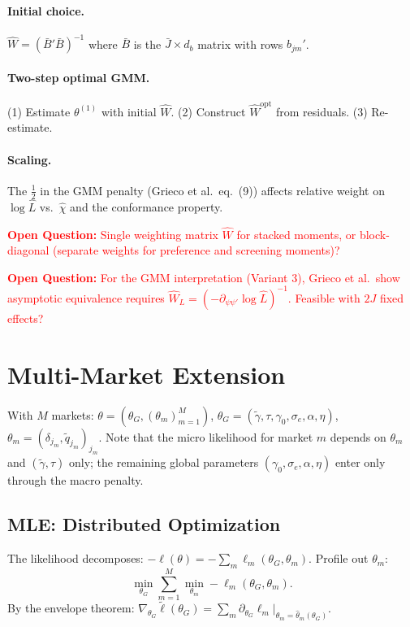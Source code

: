 \documentclass[11pt]{article}
\newcommand{\openq}[1]{\medskip\noindent\textcolor{red}{\textbf{Open Question:} #1}\medskip}
\begin{document}
\paragraph{Initial choice.} $\hat W = (\bar B'\bar B)^{-1}$ where $\bar B$ is the $\bar J\times d_b$ matrix with rows $b_{jm}'$.

\paragraph{Two-step optimal GMM.} (1) Estimate $\theta^{(1)}$ with initial $\hat W$. (2) Construct $\hat W^{\text{opt}}$ from residuals. (3) Re-estimate.

\paragraph{Scaling.} The $\frac{1}{2}$ in the GMM penalty (Grieco et al.\ eq.\ (9)) affects relative weight on $\log\hat L$ vs.\ $\hat\chi$ and the conformance property.

\openq{Single weighting matrix $\hat W$ for stacked moments, or block-diagonal (separate weights for preference and screening moments)?}

\openq{For the GMM interpretation (Variant 3), Grieco et al.\ show asymptotic equivalence requires $\hat W_L = (-\partial_{\psi\psi'}\log\hat L)^{-1}$. Feasible with $2J$ fixed effects?}


\section{Multi-Market Extension}\label{sec:multimarket}

With $M$ markets: $\theta = (\theta_G, (\theta_m)_{m=1}^M)$, $\theta_G=(\tilde\gamma,\tau,\gamma_0,\sigma_e,\alpha,\eta)$, $\theta_m = (\delta_{j_m},\tilde q_{j_m})_{j_m}$. Note that the micro likelihood for market $m$ depends on $\theta_m$ and $(\tilde\gamma,\tau)$ only; the remaining global parameters $(\gamma_0,\sigma_e,\alpha,\eta)$ enter only through the macro penalty.

\subsection{MLE: Distributed Optimization}

The likelihood decomposes: $-\ell(\theta) = -\sum_m \ell_m(\theta_G,\theta_m)$. Profile out $\theta_m$:
\[
\min_{\theta_G}\sum_{m=1}^M\min_{\theta_m} -\ell_m(\theta_G,\theta_m).
\]
By the envelope theorem: $\nabla_{\theta_G}\tilde\ell(\theta_G) = \sum_m \partial_{\theta_G}\ell_m\big|_{\theta_m=\hat\theta_m(\theta_G)}.$
\end{document}
